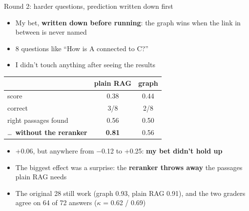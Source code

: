 \documentclass[aspectratio=169,11pt]{beamer}
\newcommand{\hl}[1]{\textcolor{midblue}{\textbf{#1}}}
\begin{document}
\begin{frame}{Round 2: harder questions, prediction written down first}
  \begin{itemize}\small
    \item My bet, \hl{written down before running}: the graph wins when the link in between is never named
    \item 8 questions like ``How is A connected to C?''
    \item I didn't touch anything after seeing the results
  \end{itemize}
  \centering\small
  \begin{tabular}{lcc}
    \toprule
    & plain RAG & graph \\
    \midrule
    score & 0.38 & 0.44 \\
    correct & 3/8 & 2/8 \\
    right passages found & 0.56 & 0.50 \\
    \ldots\ \hl{without the reranker} & \hl{0.81} & 0.56 \\
    \bottomrule
  \end{tabular}
  \vspace{6pt}
  \begin{itemize}\small
    \item +0.06, but anywhere from $-$0.12 to +0.25: \hl{my bet didn't hold up}
    \item The biggest effect was a surprise: the \hl{reranker throws away} the passages plain RAG needs
    \item The original 28 still work (graph 0.93, plain RAG 0.91), and the two graders agree
          on 64 of 72 answers ($\kappa$ = 0.62 / 0.69)
  \end{itemize}
\end{frame}
\end{document}
